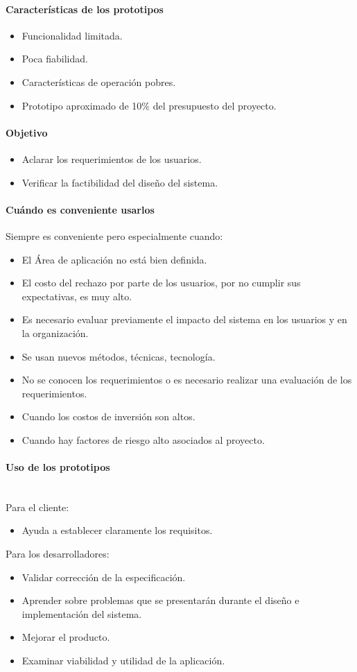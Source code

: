 \paragraph{Características de los prototipos}
\begin{itemize}
\item Funcionalidad limitada.
\item Poca fiabilidad.
\item Características de operación pobres.
\item Prototipo aproximado de 10\% del presupuesto del proyecto.
\end{itemize}
\paragraph{Objetivo}
\begin{itemize}
\item Aclarar los requerimientos de los usuarios.
\item Verificar la factibilidad del diseño del sistema.
\end{itemize}
\paragraph{Cuándo es conveniente usarlos}
Siempre es conveniente pero especialmente cuando:
\begin{itemize}
\item El Área de aplicación no está bien definida.
\item El costo del rechazo por parte de los usuarios, por no cumplir sus expectativas, es muy alto.
\item Es necesario evaluar previamente el impacto del sistema en los usuarios y en la organización.
\item Se usan nuevos métodos, técnicas, tecnología.
\item No se conocen los requerimientos o es necesario realizar una evaluación de los requerimientos.
\item Cuando los costos de inversión son altos.
\item Cuando hay factores de riesgo alto asociados al proyecto.
\end{itemize}
\paragraph{Uso de los prototipos} \hspace{0pt}\\
Para el cliente:
\begin{itemize}
\item Ayuda a establecer claramente los requisitos.
\end{itemize}
Para los desarrolladores:
\begin{itemize}
\item Validar corrección de la especificación.
\item Aprender sobre problemas que se presentarán durante el diseño e implementación del sistema.
\item Mejorar el producto.
\item Examinar viabilidad y utilidad de la aplicación.
\end{itemize}
